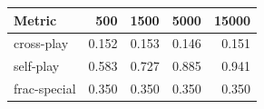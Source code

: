 \begin{tabular}{lrrrr}\toprule
Metric & 500 & 1500 & 5000 & 15000 \\ \midrule
cross-play & 0.152 & 0.153 & 0.146 & 0.151 \\
self-play & 0.583 & 0.727 & 0.885 & 0.941 \\
frac-special & 0.350 & 0.350 & 0.350 & 0.350 \\
\bottomrule\end{tabular}